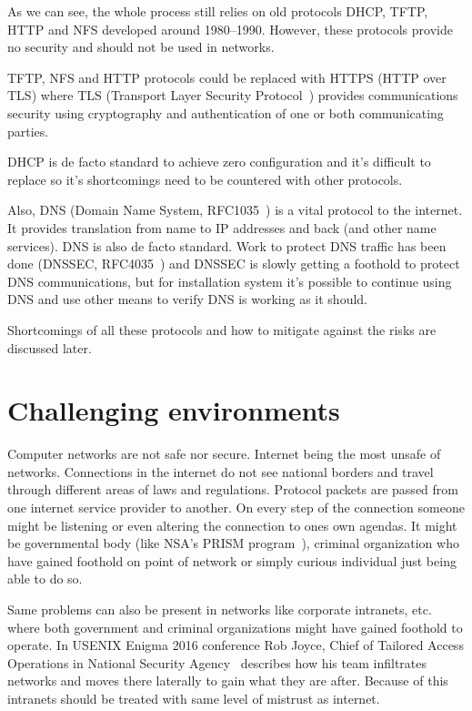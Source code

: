 As we can see, the whole process still relies on old protocols DHCP,
TFTP, HTTP and NFS developed around 1980--1990. However, these
protocols provide no security and should not be used in networks.

TFTP, NFS and HTTP protocols could be replaced with HTTPS (HTTP over
TLS) where TLS (Transport Layer Security Protocol~\cite{RFC5246})
provides communications security using cryptography and authentication
of one or both communicating parties.

DHCP is de facto standard to achieve zero configuration and it's
difficult to replace so it's shortcomings need to be countered with
other protocols.

Also, DNS (Domain Name System, RFC1035~\cite{rfc1035}) is a vital
protocol to the internet. It provides translation from name to IP
addresses and back (and other name services). DNS is also de facto
standard. Work to protect DNS traffic has been done (DNSSEC,
RFC4035~\cite{rfc4035}) and DNSSEC is slowly getting a foothold to
protect DNS communications, but for installation system it's possible
to continue using DNS and use other means to verify DNS is working as
it should.

Shortcomings of all these protocols and how to mitigate against the
risks are discussed later.

\section{Challenging environments}

Computer networks are not safe nor secure. Internet being the most
unsafe of networks. Connections in the internet do not see national
borders and travel through different areas of laws and
regulations. Protocol packets are passed from one internet service
provider to another. On every step of the connection someone might be
listening or even altering the connection to ones own agendas. It
might be governmental body (like NSA's PRISM
program~\cite{nsa-prism}), criminal organization who have gained
foothold on point of network or simply curious individual just being
able to do so.

Same problems can also be present in networks like corporate
intranets, etc. where both government and criminal organizations might
have gained foothold to operate. In USENIX Enigma 2016 conference Rob
Joyce, Chief of Tailored Access Operations in National Security
Agency~\cite{nsa-tao} describes how his team infiltrates networks and
moves there laterally to gain what they are after. Because of this
intranets should be treated with same level of mistrust as internet.


